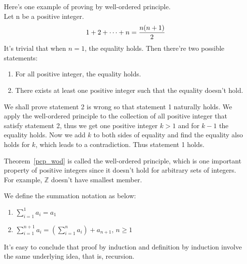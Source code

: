 \documentclass[a4paper]{ctexart}
\begin{document}
	\begin{myex}
		Here's one example of proving by well-ordered principle.\\ Let n be a positive integer.
		\begin{equation}
			1+2+\cdots+n=\frac{n(n+1)}{2}\notag
		\end{equation}
		It's trivial that when $n=1$, the equality holds. Then there're two possible statements:
		\begin{enumerate}
			\item For all positive integer, the equality holds.
			\item There exists at least one positive integer such that the equality doesn't hold.
		\end{enumerate}
		We shall prove statement 2 is wrong so that statement 1 naturally holds. We apply the well-ordered principle to the collection of all positive integer that satisfy statement 2, thus we get one positive integer $k>1$ and for $k-1$ the equality holds. Now we add $k$ to both sides of equality and find the equality also holds for $k$, which leads to a contradiction. Thus statement 1 holds.
	\end{myex}
	\begin{myrmk}
		Theorem~\ref{pcp_wod} is called the well-ordered principle, which is one important property of positive integers since it doesn't hold for arbitrary sets of integers. For example, $\mathbb{Z}$ doesn't have smallest member.
	\end{myrmk}
	\begin{mynot}
		We define the summation notation as below:
		\begin{enumerate}
			\item $\displaystyle\sum_{i=1}^1a_i=a_1$
			\item $\displaystyle\sum_{i=1}^{n+1}a_{i}=\left(\sum\limits_{i=1}^n a_i \right) + a_{n+1}$, $n\ge 1$
		\end{enumerate}
	\end{mynot}
	\begin{myrmk}
		It's easy to conclude that proof by induction and definition by induction involve the same underlying idea, that is, recursion.
	\end{myrmk}
\end{document}

